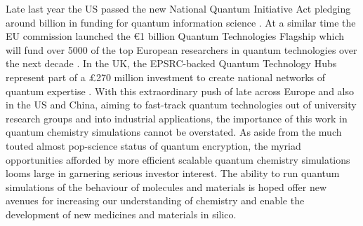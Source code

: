 \documentclass[12pt]{article}
\begin{document}
Late last year the US passed the new National Quantum Initiative Act pledging around  billion in funding for quantum information science \cite{usbill}. At a similar time the EU commission launched the €1 billion Quantum Technologies Flagship which will fund over 5000 of the top European researchers in quantum technologies over the next decade \cite{eubill}. In the UK, the EPSRC-backed Quantum Technology Hubs represent part of a £270 million investment to create national networks of quantum expertise \cite{ukbill}. With this extraordinary push of late across Europe and also in the US and China, aiming to fast-track quantum technologies out of university research groups and into industrial applications, the importance of this work in quantum chemistry simulations cannot be overstated. As aside from the much touted almost pop-science status of quantum encryption, the myriad opportunities afforded by more efficient scalable quantum chemistry simulations looms large in garnering serious investor interest. The ability to run quantum simulations of the behaviour of molecules and materials is hoped offer new avenues for increasing our understanding of chemistry and enable the development of new medicines and materials in silico.





\end{document}
